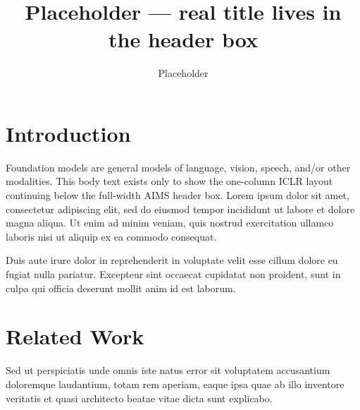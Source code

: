 \documentclass{article}
\title{Placeholder --- real title lives in the header box}
\author{Placeholder}
\begin{document}

\vspace{14pt}

\section{Introduction}

Foundation models are general models of language, vision, speech, and/or
other modalities. This body text exists only to show the one-column ICLR
layout continuing below the full-width AIMS header box. Lorem ipsum dolor
sit amet, consectetur adipiscing elit, sed do eiusmod tempor incididunt ut
labore et dolore magna aliqua. Ut enim ad minim veniam, quis nostrud
exercitation ullamco laboris nisi ut aliquip ex ea commodo consequat.

Duis aute irure dolor in reprehenderit in voluptate velit esse cillum
dolore eu fugiat nulla pariatur. Excepteur sint occaecat cupidatat non
proident, sunt in culpa qui officia deserunt mollit anim id est laborum.

\section{Related Work}

Sed ut perspiciatis unde omnis iste natus error sit voluptatem accusantium
doloremque laudantium, totam rem aperiam, eaque ipsa quae ab illo inventore
veritatis et quasi architecto beatae vitae dicta sunt explicabo.
\end{document}
